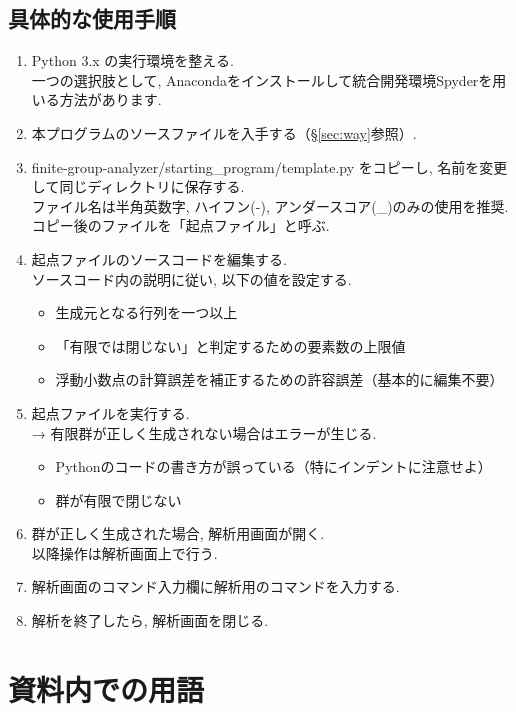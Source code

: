 \documentclass[11pt, a4paper]{jsarticle}
\begin{document}
\subsection{具体的な使用手順}
\begin{enumerate}
\item Python 3.x の実行環境を整える. \\
一つの選択肢として, Anacondaをインストールして統合開発環境Spyderを用いる方法があります.
\item 本プログラムのソースファイルを入手する（\S\ref{sec:way}参照）.
\item finite-group-analyzer/starting\_program/template.py をコピーし, 名前を変更して同じディレクトリに保存する. \\
ファイル名は半角英数字, ハイフン(-), アンダースコア(\_)のみの使用を推奨. \\
コピー後のファイルを「起点ファイル」と呼ぶ.
\item 起点ファイルのソースコードを編集する. \\
ソースコード内の説明に従い, 以下の値を設定する.
	\begin{itemize}
	\item 生成元となる行列を一つ以上
	\item 「有限では閉じない」と判定するための要素数の上限値
	\item 浮動小数点の計算誤差を補正するための許容誤差（基本的に編集不要）
	\end{itemize}
\item 起点ファイルを実行する. \\
→ 有限群が正しく生成されない場合はエラーが生じる.
	\begin{itemize}
	\item Pythonのコードの書き方が誤っている（特にインデントに注意せよ）
	\item 群が有限で閉じない
	\end{itemize}
\item 群が正しく生成された場合, 解析用画面が開く. \\
以降操作は解析画面上で行う.
\item 解析画面のコマンド入力欄に解析用のコマンドを入力する.
\item 解析を終了したら, 解析画面を閉じる.
\end{enumerate}

\section{資料内での用語}
\end{document}

